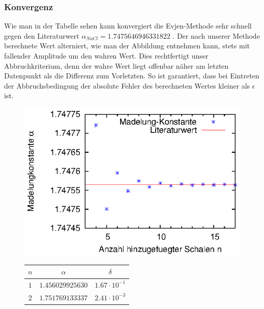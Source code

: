 \documentclass[10pt,a4paper]{article}
\begin{document}
\subsubsection{Konvergenz}
\label{sssec:Konvergenz}

Wie man in der Tabelle sehen kann konvergiert die Evjen-Methode sehr schnell
gegen den Literaturwert $\alpha_{NaCl} = 1.7475646946331822$ \cite{Sakamoto}.
Der nach unserer Methode berechnete Wert alterniert, wie man der Abbildung
entnehmen kann, stets mit fallender Amplitude um den wahren Wert. Dies
rechtfertigt unser Abbruchkriterium, denn der wahre Wert liegt offenbar
näher am letzten Datenpunkt als die Differenz zum Vorletzten. So ist garantiert,
dass bei Eintreten der Abbruchsbedingung der absolute Fehler des berechneten
Wertes kleiner als $\epsilon$ ist.

\begin{figure}
\begin{minipage}[c]{0.5\textwidth}
\begin{center}
\includegraphics[width=\textwidth]{./figures/ergebnis.eps}
\label{plotkonvergenz3d}
\end{center}
\end{minipage}
\begin{minipage}[c]{0.5\textwidth}
\begin{center}
\begin{tabular}{c|c|c}
\rule[-1ex]{0pt}{2.5ex} $n$ & $\alpha$ & $\delta$ \\ 
\hline 
\rule[-1ex]{0pt}{2.5ex} $1$ & $1.456029925630$ & $1.67\cdot10^{-1}$ \\ 
\hline 
\rule[-1ex]{0pt}{2.5ex} $2$ & $1.751769133337$ & $2.41\cdot10^{-3}$ \\ 

\end{tabular}
\end{center}
\end{minipage}
\end{figure}
\end{document}
